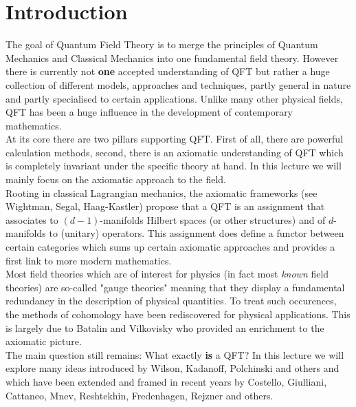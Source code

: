 \section{Introduction}
\label{sec:Introduction}

The goal of Quantum Field Theory is to merge the principles of Quantum Mechanics and Classical Mechanics into one fundamental field theory. However there is currently not \textbf{one} accepted understanding of QFT but rather a huge collection of different models, approaches and techniques, partly general in nature and partly specialised to certain applications. Unlike many other physical fields, QFT has been a huge influence in the development of contemporary mathematics.\\

At its core there are two pillars supporting QFT. First of all, there are powerful calculation methods, second, there is an axiomatic understanding of QFT which is completely invariant under the specific theory at hand. In this lecture we will mainly focus on the axiomatic approach to the field.\\

Rooting in classical Lagrangian mechanics, the axiomatic frameworks (see Wightman, Segal, Haag-Kastler) propose that a QFT is an assignment that associates to $(d-1)$-manifolds Hilbert spaces (or other structures) and of $d$-manifolds to (unitary) operators. This assignment does define a functor between certain categories which sums up certain axiomatic approaches and provides a first link to more modern mathematics.\\

Most field theories which are of interest for physics (in fact most \emph{known} field theories) are so-called "gauge theories" meaning that they display a fundamental redundancy in the description of physical quantities. To treat such occurences, the methods of cohomology have been rediscovered for physical applications. This is largely due to Batalin and Vilkovisky who provided an enrichment to the axiomatic picture.\\

The main question still remains: What exactly \textbf{is} a QFT? In this lecture we will explore many ideas introduced by Wilson, Kadanoff, Polchinski and others and which have been extended and framed in recent years by Costello, Giulliani, Cattaneo, Mnev, Reshtekhin, Fredenhagen, Rejzner and others.


\newpage
